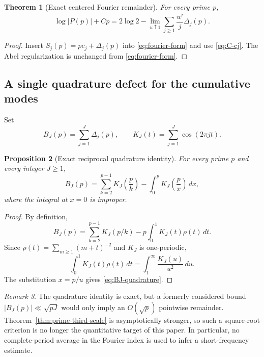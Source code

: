 \documentclass[11pt]{amsart}
\numberwithin{equation}{section}
\newtheorem{theorem}{Theorem}[section]
\newtheorem{proposition}[theorem]{Proposition}
\theoremstyle{definition}
\theoremstyle{remark}
\newtheorem{remark}[theorem]{Remark}
\begin{document}
\begin{theorem}[Exact centered Fourier remainder]\label{thm:centered-Fourier-prime}
For every prime \(p\),
\begin{equation}\label{eq:centered-Fourier-prime}
 \log|P(p)|+Cp
 =2\log2-\lim_{u\uparrow1}\sum_{j\ge1}\frac{u^j}{j}\Delta_j(p).
\end{equation}
\end{theorem}

\begin{proof}
Insert \(S_j(p)=pc_j+\Delta_j(p)\) into
\eqref{eq:fourier-form} and use \eqref{eq:C-cj}.  The Abel regularization is
unchanged from \eqref{eq:fourier-form}.
\end{proof}

\subsection{A single quadrature defect for the cumulative modes}

Set
\begin{equation}\label{eq:BJ-def}
 B_J(p)=\sum_{j=1}^J\Delta_j(p),
 \qquad K_J(t)=\sum_{j=1}^J\cos(2\pi jt).
\end{equation}

\begin{proposition}[Exact reciprocal quadrature identity]\label{prop:BJ-quadrature}
For every prime \(p\) and every integer \(J\ge1\),
\begin{equation}\label{eq:BJ-quadrature}
 B_J(p)=\sum_{k=2}^{p-1}K_J\!\left(\frac pk\right)
 -\int_0^pK_J\!\left(\frac px\right)\,dx,
\end{equation}
where the integral at \(x=0\) is improper.
\end{proposition}

\begin{proof}
By definition,
\[
 B_J(p)=\sum_{k=2}^{p-1}K_J(p/k)
 -p\int_0^1K_J(t)\rho(t)\,dt.
\]
Since \(\rho(t)=\sum_{m\ge1}(m+t)^{-2}\) and \(K_J\) is one-periodic,
\[
 \int_0^1K_J(t)\rho(t)\,dt
 =\int_1^\infty\frac{K_J(u)}{u^2}\,du.
\]
The substitution \(x=p/u\) gives \eqref{eq:BJ-quadrature}.
\end{proof}

\begin{remark}\label{rem:BJ-current-role}
The quadrature identity is exact, but a formerly considered bound
\(|B_J(p)|\ll\sqrt{pJ}\) would only imply an \(O(\sqrt p)\) pointwise
remainder.  Theorem~\ref{thm:prime-third-scale} is asymptotically stronger,
so such a square-root criterion is no longer the quantitative target of
this paper.  In particular, no complete-period average in the Fourier index
is used to infer a short-frequency estimate.
\end{remark}
\end{document}
